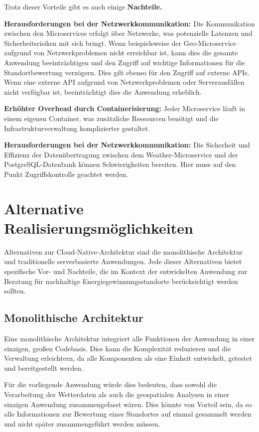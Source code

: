Trotz dieser Vorteile gibt es auch einige \textbf{Nachteile.} 

\textbf{Herausforderungen bei der Netzwerkkommunikation:} Die Kommunikation zwischen den Microservices erfolgt über Netzwerke, was potenzielle Latenzen und Sicherheitsrisiken mit sich bringt. Wenn beispielsweise der Geo-Microservice aufgrund von Netzwerkproblemen nicht erreichbar ist, kann dies die gesamte Anwendung beeinträchtigen und den Zugriff auf wichtige Informationen für die Standortbewertung verzögern. Dies gilt ebenso für den Zugriff auf externe APIs. Wenn eine externe API aufgrund von Netzwerkproblemen oder Serverausfällen nicht verfügbar ist, beeinträchtigt dies die Anwendung erheblich.

\textbf{Erhöhter Overhead durch Containerisierung:} Jeder Microservice läuft in einem eigenen Container, was zusätzliche Ressourcen benötigt und die Infrastrukturverwaltung komplizierter gestaltet.

\textbf{Herausforderungen bei der Netzwerkkommunikation:} Die Sicherheit und Effizienz der Datenübertragung zwischen dem Weather-Microservice und der PostgreSQL-Datenbank können Schwierigkeiten bereiten. Hier muss auf den Punkt Zugriffskontrolle geachtet werden.

\section{Alternative Realisierungsmöglichkeiten}

Alternativen zur Cloud-Native-Architektur sind die monolithische Architektur und traditionelle serverbasierte Anwendungen. Jede dieser Alternativen bietet spezifische Vor- und Nachteile, die im Kontext der entwickelten Anwendung zur Beratung für nachhaltige Energiegewinnungsstandorte berücksichtigt werden sollten.

\subsection{Monolithische Architektur}
Eine monolithische Architektur integriert alle Funktionen der Anwendung in einer einzigen, großen Codebasis. Dies kann die Komplexität reduzieren und die Verwaltung erleichtern, da alle Komponenten als eine Einheit entwickelt, getestet und bereitgestellt werden. 

Für die vorliegende Anwendung würde dies bedeuten, dass sowohl die Verarbeitung der Wetterdaten als auch die geospatialen Analysen in einer einzigen Anwendung zusammengefasst wären. Dies könnte von Vorteil sein, da so alle Informationen zur Bewertung eines Standortes auf einmal gesammelt werden und nicht später zusammengeführt werden müssen.

